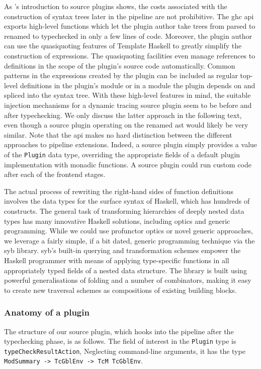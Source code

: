 \documentclass[thesis=B,english]{FITthesis}[2019/12/23]
\newcommand{\hsType}[1]{\texttt{#1}}
\newcommand{\hsIdent}[1]{\texttt{#1}}
\begin{document}
As \citeauthor{blog-source-plugins}'s introduction to source plugins shows, the
costs associated with the construction of syntax trees later in the pipeline
are not prohibitive\cite{blog-source-plugins}. The \acrshort{ghc}
\acrshort{api} exports high-level functions which let the plugin author take
trees from parsed to renamed to typechecked in only a few lines of code.
Moreover, the plugin author can use the quasi\-quoting\cite{th-quasiquoting}
features of Template Haskell\cite{th-classic} to greatly simplify the
construction of expressions. The quasi\-quoting facilities even manage
references to definitions in the scope of the plugin's source code
automatically. Common patterns in the expressions created by the plugin can be
included as regular top-level definitions in the plugin's module or in a module
the plugin depends on and spliced into the syntax tree. With these high-level
features in mind, the suitable injection mechanisms for a dynamic tracing
source plugin seem to be before and after typechecking. We only discuss the
latter approach in the following text, even though a source plugin operating on
the renamed \acrshort{ast} would likely be very similar. Note that the
\acrshort{api} makes no hard distinction between the different approaches to
pipeline extensions. Indeed, a source plugin simply provides a value of the
\hsType{Plugin} data type, overriding the appropriate fields of a default
plugin implementation with monadic functions. A source plugin could run custom
code after each of the frontend stages.

The actual process of rewriting the right-hand sides of function definitions
involves the data types for the surface syntax of Haskell, which has hundreds
of constructs\cite[Key~Design~Choices]{arch-ghc}. The general task of
transforming hierarchies of deeply nested data types has many innovative
Haskell solutions, including optics and generic programming. While we could use
pro\-functor optics or novel generic approaches, we leverage a fairly simple,
if a bit dated, generic programming technique via the \acrfull{syb}
library\cite{syb-paper}. \acrshort{syb}'s built-in querying and transformation
schemes empower the Haskell programmer with means of applying type-specific
functions in all appropriately typed fields of a nested data structure. The
library is built using powerful generalisations of folding and a number of
combinators, making it easy to create new traversal schemes as compositions of
existing building blocks.

\subsubsection*{Anatomy of a plugin}
The structure of our source plugin, which hooks into the pipeline after the
typechecking phase, is as follows. The field of interest in the \hsType{Plugin}
type is \hsIdent{typeCheckResultAction}, Neglecting command-line arguments, it
has the type \hsType{ModSummary -> TcGblEnv -> TcM TcGblEnv}.
\end{document}
